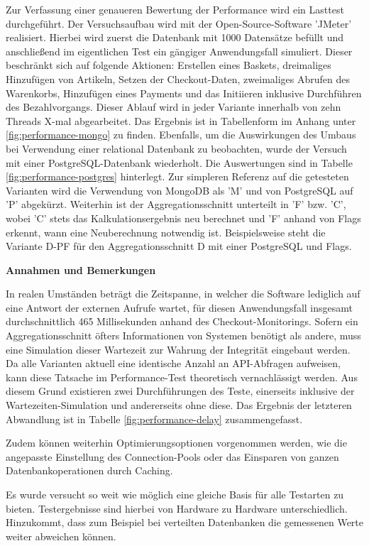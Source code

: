 Zur Verfassung einer genaueren Bewertung der Performance wird ein Lasttest durchgeführt. Der Versuchsaufbau wird mit der Open-Source-Software 'JMeter' realisiert. Hierbei wird zuerst die Datenbank mit 1000 Datensätze befüllt und anschließend im eigentlichen Test ein gängiger Anwendungsfall simuliert. Dieser beschränkt sich auf folgende Aktionen: Erstellen eines Baskets, dreimaliges Hinzufügen von Artikeln, Setzen der Checkout-Daten, zweimaliges Abrufen des Warenkorbs, Hinzufügen eines Payments und das Initiieren inklusive Durchführen des Bezahlvorgangs. Dieser Ablauf wird in jeder Variante innerhalb von zehn Threads X-mal abgearbeitet. Das Ergebnis ist in Tabellenform im Anhang unter \ref{fig:performance-mongo} zu finden. Ebenfalls, um die Auswirkungen des Umbaus bei Verwendung einer relational Datenbank zu beobachten, wurde der Versuch mit einer PostgreSQL-Datenbank wiederholt. Die Auswertungen sind in Tabelle \ref{fig:performance-postgres} hinterlegt. Zur simpleren Referenz auf die getesteten Varianten wird die Verwendung von MongoDB als 'M' und von PostgreSQL auf 'P' abgekürzt. Weiterhin ist der Aggregationsschnitt unterteilt in 'F' bzw. 'C', wobei 'C' stets das Kalkulationsergebnis neu berechnet und 'F' anhand von Flags erkennt, wann eine Neuberechnung notwendig ist. Beispielsweise steht die Variante D-PF für den Aggregationsschnitt D mit einer PostgreSQL und Flags.

\textbf{Annahmen und Bemerkungen}

In realen Umständen beträgt die Zeitspanne, in welcher die Software lediglich auf eine Antwort der externen Aufrufe wartet, für diesen Anwendungsfall insgesamt durchschnittlich 465 Millisekunden anhand des Checkout-Monitorings. Sofern ein Aggregationsschnitt öfters Informationen von Systemen benötigt als andere, muss eine Simulation dieser Wartezeit zur Wahrung der Integrität eingebaut werden. Da alle Varianten aktuell eine identische Anzahl an API-Abfragen aufweisen, kann diese Tatsache im Performance-Test theoretisch vernachlässigt werden. Aus diesem Grund existieren zwei Durchführungen des Teste, einerseits inklusive der Wartezeiten-Simulation und andererseits ohne diese. Das Ergebnis der letzteren Abwandlung ist in Tabelle \ref{fig:performance-delay} zusammengefasst.

Zudem können weiterhin Optimierungsoptionen vorgenommen werden, wie die angepasste Einstellung des Connection-Pools oder das Einsparen von ganzen Datenbankoperationen durch Caching. 

Es wurde versucht so weit wie möglich eine gleiche Basis für alle Testarten zu bieten. Testergebnisse sind hierbei von Hardware zu Hardware unterschiedlich. Hinzukommt, dass zum Beispiel bei verteilten Datenbanken die gemessenen Werte weiter abweichen können.

